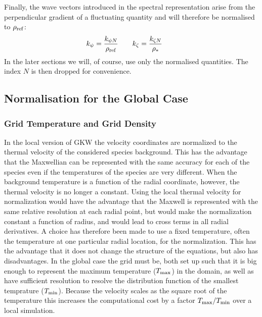 Finally, the wave vectors introduced in the spectral representation arise from the perpendicular
gradient of a fluctuating quantity and will therefore be normalised to $\rho_{\rm ref}$:
\begin{align} 
k_\psi = \frac{k_{\psi N}}{\rho_{\rm ref}} \qquad 
k_\zeta = \frac{k_{\zeta N}}{\rho_*} \qquad 
\label{eq:kN}
\end{align}
In the later sections we will, of course, use only the normalised quantities. 
The index $N$ is then dropped for convenience. 

\subsection{Normalisation for the Global Case}
\label{sec:normalisation-global-specialities}

\subsubsection*{Grid Temperature and Grid Density}
\label{sec:grid-temp-grid-dens}

In the local version of GKW the velocity coordinates are normalized to the thermal velocity 
of the considered species background.  
This has the advantage that the Maxwellian can be represented with the same accuracy for 
each of the species even if the temperatures of the species are very different. 
When the background temperature is a function of the radial coordinate, however, the thermal velocity is no 
longer a constant. 
Using the local thermal velocity for normalization would have the advantage that the Maxwell 
is represented with the same relative resolution at each radial point, but would make the 
normalization constant a function of radius, and would lead to cross terms in all radial 
derivatives. A choice has therefore been made to use a fixed temperature, often the temperature at 
one particular radial location, for the normalization. This has the advantage that it does not change the structure 
of the equations, but also has disadvantages. In the global case the grid must be, both set up 
such that it is big enough to represent the maximum temperature ($T_{\rm max}$) in the domain, as well as 
have sufficient resolution to resolve the distribution function of the smallest temprature
($T_{\rm min}$). Because the velocity scales as the square root of the temperature this increases 
the computational cost by a factor $T_{\rm max} / T_{\rm min}$ over a local simulation. 


